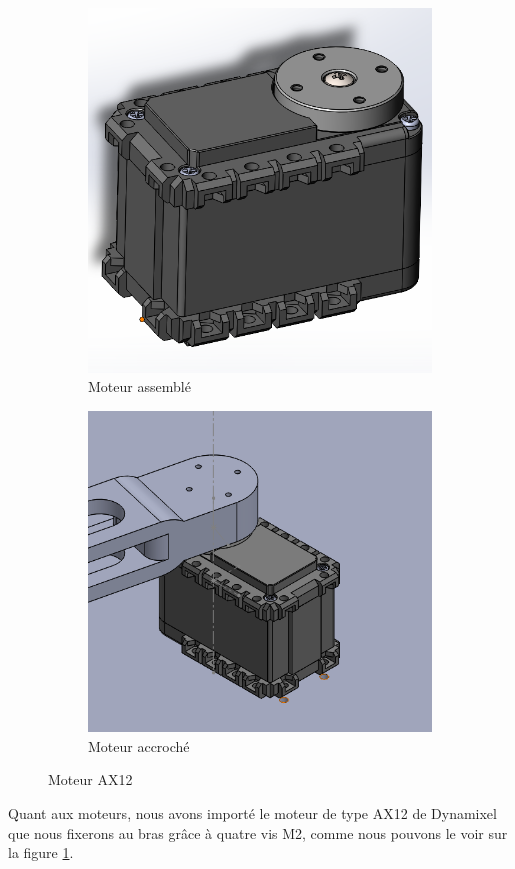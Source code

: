 \documentclass[a4paper, 11pt]{report}
\begin{document}
\begin{figure}[!tbh]
    \centering
    \begin{subfigure}[t]{0.45\textwidth}
        \centering
        \includegraphics[width=\textwidth]{Figures/moteur_AX12.png}
        \caption{Moteur assemblé}
    \end{subfigure}
    \hfill
    \begin{subfigure}[t]{0.50\textwidth}
        \centering
        \includegraphics[width=\textwidth]{Figures/moteur_accroche.png}
        \caption{Moteur accroché}
    \end{subfigure}
    \caption{Moteur AX12}
    \label{fig:moteur}
\end{figure}
Quant aux moteurs, nous avons importé le moteur de type AX12 de Dynamixel que nous fixerons au bras grâce à quatre vis M2, comme nous pouvons le voir sur la figure \ref{fig:moteur}.
\end{document}
